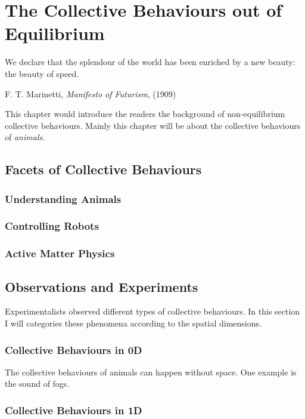 \documentclass[11pt,twoside]{report}
\begin{document}
\chapter{The Collective Behaviours out of Equilibrium}

\epigraph{We declare that the splendour of the world has been enriched by a new beauty: the beauty of speed.}{F. T. Marinetti, \emph{Manifesto of Futurism}, (1909)}

This chapter would introduce the readers the background of non-equilibrium collective behaviours. Mainly this chapter will be about the collective behaviours of \emph{animals}.

\section{Facets of Collective Behaviours}

\subsection{Understanding Animals}

\subsection{Controlling Robots}

\subsection{Active Matter Physics}


\section{Observations and Experiments}

Experimentalists observed different types of collective behaviours. In this section I will categories these phenomena according to the spatial dimensions. 

\subsection{Collective Behaviours in 0D}

The collective behaviours of animals can happen without space. One example is the sound of fogs.

\subsection{Collective Behaviours in 1D}
\end{document}
